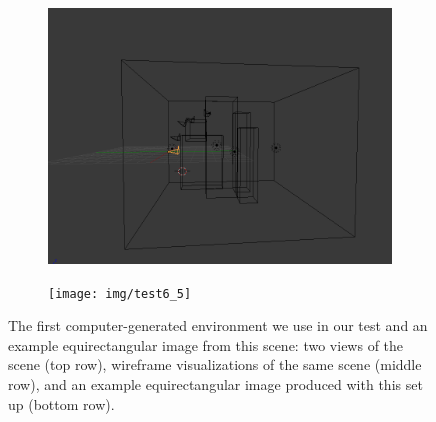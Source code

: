 \begin{figure}
\begin{subfigure}{0.4\textwidth}
		\includegraphics[width=\textwidth]{img/test6_4}
	\end{subfigure}
	\begin{subfigure}{0.8\textwidth}
		\centering
		\texttt{[image: img/test6\_5]}
	\end{subfigure}
	\caption{The first computer-generated environment we use in our test and
	an example equirectangular image from this scene: two views of the scene (top row),
	wireframe visualizations of the same scene (middle row), and an example
	equirectangular image produced with this set up (bottom row).}
    \label{fig:test6}
\end{figure}
%

